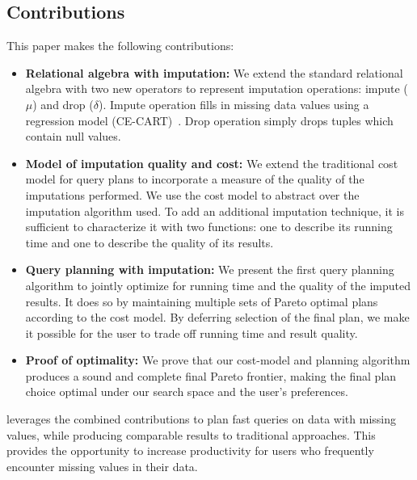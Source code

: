 \subsection{Contributions}
This paper makes the following contributions:
\begin{itemize}
\item \textbf{Relational algebra with imputation:}
  We extend the standard relational algebra with two new operators to represent imputation operations: impute ($\mu$) and drop ($\delta$).
  Impute operation fills in missing data values using a regression model (CE-CART)~\cite{burgette2010multiple}.
  Drop operation simply drops tuples which contain null values.
\item \textbf{Model of imputation quality and cost:}
  We extend the traditional cost model for query plans to incorporate a measure of the quality of the imputations performed.
  We use the cost model to abstract over the imputation algorithm used.
  To add an additional imputation technique, it is sufficient to characterize it with two functions: one to describe its running time and one to describe the quality of its results.
\item \textbf{Query planning with imputation:}
  We present the first query planning algorithm to jointly optimize for running time and the quality of the imputed results.
  It does so by maintaining multiple sets of Pareto optimal plans according to the cost model.
  By deferring selection of the final plan, we make it possible for the user to trade off running time and result quality.
\item \textbf{Proof of optimality:}
 We prove that our cost-model and planning algorithm produces a sound and complete final Pareto frontier, making the final plan choice optimal under our search space and the user's preferences.
\end{itemize}

\ProjectName{} leverages the combined contributions to plan fast queries on data with missing values, while producing comparable results to traditional approaches.
This provides the opportunity to increase productivity for users who frequently encounter missing values in their data.




